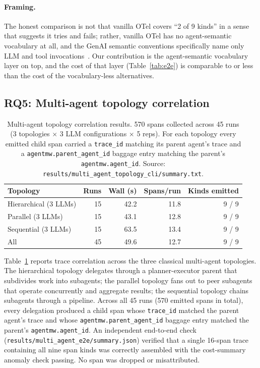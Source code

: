 \documentclass[sigconf,review,anonymous,9pt]{acmart}
\begin{document}
\paragraph{Framing.} The honest comparison is not that vanilla OTel
covers ``2 of 9 kinds'' in a sense that suggests it tries and fails;
rather, vanilla OTel has no agent-semantic vocabulary at all, and
the GenAI semantic conventions specifically name only LLM and tool
invocations~\cite{otel_genai_semconv}. Our contribution is the
agent-semantic vocabulary layer on top, and the cost of that layer
(Table~\ref{tab:e2e}) is comparable to or less than the cost of the
vocabulary-less alternatives.

\subsection{RQ5: Multi-agent topology correlation}

\begin{table}[t]
\centering
\small
\caption{Multi-agent topology correlation results.
570 spans collected across 45 runs (3 topologies $\times$ 3 LLM
configurations $\times$ 5 reps).
For each topology every emitted child span carried a
\texttt{trace\_id} matching its parent agent's trace and a
\texttt{agentmw.parent\_agent\_id} baggage entry matching
the parent's \texttt{agentmw.agent\_id}.
Source: \texttt{results/multi\_agent\_topology\_cli/summary.txt}.}
\label{tab:multiagent}
\begin{tabular}{@{}lrrrr@{}}
\toprule
\textbf{Topology}        & \textbf{Runs} & \textbf{Wall (s)} & \textbf{Spans/run} & \textbf{Kinds emitted} \\
\midrule
Hierarchical (3 LLMs)    & 15 & 42.2 & 11.8 & 9 / 9 \\
Parallel (3 LLMs)        & 15 & 43.1 & 12.8 & 9 / 9 \\
Sequential (3 LLMs)      & 15 & 63.5 & 13.4 & 9 / 9 \\
\midrule
All                      & 45 & 49.6 & 12.7 & 9 / 9 \\
\bottomrule
\end{tabular}
\end{table}

Table~\ref{tab:multiagent} reports trace correlation across the three
classical multi-agent topologies. The hierarchical topology delegates
through a planner-executor parent that subdivides work into
subagents; the parallel topology fans out to peer subagents that
operate concurrently and aggregate results; the sequential topology
chains subagents through a pipeline. Across all 45 runs (570 emitted
spans in total), every delegation produced a child span whose
\texttt{trace\_id} matched the parent agent's trace and whose
\texttt{agentmw.parent\_agent\_id} baggage entry matched the
parent's \texttt{agentmw.agent\_id}. An independent
end-to-end check (\texttt{results/multi\_agent\_e2e/summary.json})
verified that a single 16-span trace containing all nine span kinds
was correctly assembled with the cost-summary anomaly check passing.
No span was dropped or misattributed.
\end{document}
